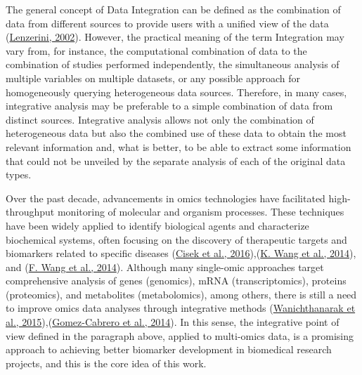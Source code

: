 \documentclass[a4paper, nobind]{templates/ociamthesis}
\begin{document}
The general concept of Data Integration can be defined as the combination of data from different sources to provide users with a unified view of the data (\protect\hyperlink{ref-lenzerini_data_2002}{Lenzerini, 2002}). However, the practical meaning of the term Integration may vary from, for instance, the computational combination of data to the combination of studies performed independently, the simultaneous analysis of multiple variables on multiple datasets, or any possible approach for homogeneously querying heterogeneous data sources. Therefore, in many cases, integrative analysis may be preferable to a simple combination of data from distinct sources. Integrative analysis allows not only the combination of heterogeneous data but also the combined use of these data to obtain the most relevant information and, what is better, to be able to extract some information that could not be unveiled by the separate analysis of each of the original data types.

Over the past decade, advancements in omics technologies have facilitated high-throughput monitoring of molecular and organism processes. These techniques have been widely applied to identify biological agents and characterize biochemical systems, often focusing on the discovery of therapeutic targets and biomarkers related to specific diseases (\protect\hyperlink{ref-cisek_application_2016}{Cisek et al., 2016}),(\protect\hyperlink{ref-wang_proteomics_2014}{K. Wang et al., 2014}), and (\protect\hyperlink{ref-wang_circulating_2014}{F. Wang et al., 2014}). Although many single-omic approaches target comprehensive analysis of genes (genomics), mRNA (transcriptomics), proteins (proteomics), and metabolites (metabolomics), among others, there is still a need to improve omics data analyses through integrative methods (\protect\hyperlink{ref-wanichthanarak_genomic_2015}{Wanichthanarak et al., 2015}),(\protect\hyperlink{ref-gomez-cabrero_data_2014}{Gomez-Cabrero et al., 2014}). In this sense, the integrative point of view defined in the paragraph above, applied to multi-omics data, is a promising approach to achieving better biomarker development in biomedical research projects, and this is the core idea of this work.
\end{document}
